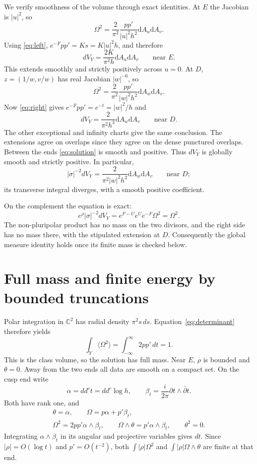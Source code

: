 \documentclass[11pt]{article}
\newcommand{\ddc}{dd^c}
\newcommand{\dA}{\mathrm dA}
\newcommand{\C}{\mathbb C}
\begin{document}
We verify smoothness of the volume through exact identities. At $E$
the Jacobian is $|u|^2$, so
\[
 \Omega^2=\frac2{\pi^2}\frac{pp'}{|u|^2h^2}\dA_u\dA_v.
\]
Using \eqref{eq:left}, $e^{-F}pp'=Ks=K|u|^2h$, and therefore
\begin{equation}\label{eq:volume-E}
 dV_Y=\frac{2K}{\pi^2h}\dA_u\dA_v
 \qquad\text{near }E.
\end{equation}
This extends smoothly and strictly positively across $u=0$.
At $D$, $z=(1/w,v/w)$ has real Jacobian $|w|^{-6}$, so
\[
 \Omega^2=\frac2{\pi^2}\frac{pp'}{|w|^2h^2}\dA_w\dA_v.
\]
Now \eqref{eq:right} gives $e^{-F}pp'=e^{-t}=|w|^2/h$ and
\begin{equation}\label{eq:volume-D}
 dV_Y=\frac2{\pi^2h^3}\dA_w\dA_v
 \qquad\text{near }D.
\end{equation}
The other exceptional and infinity charts give the same conclusion.
The extensions agree on overlaps since they agree on the dense punctured
overlaps. Between the ends \eqref{eq:solution} is smooth and positive.
Thus $dV_Y$ is globally smooth and strictly positive. In particular,
\[
 |\sigma|^{-2}dV_Y=\frac2{\pi^2|w|^2h^2}\dA_w\dA_v
 \qquad\text{near }D;
\]
its transverse integral diverges, with a smooth positive coefficient.

On the complement the equation is exact:
\[
 e^\rho|\sigma|^{-2}dV_Y
          =e^{F-U}e^Ue^{-F}\Omega^2=\Omega^2.
\]
The non-pluripolar product has no mass on the two divisors, and the
right side has no mass there, with the stipulated extension at $D$.
Consequently the global measure identity holds once its finite mass
is checked below.

\section{Full mass and finite energy by bounded truncations}
Polar integration in $\C^2$ has radial density $\pi^2s\,ds$.
Equation~\eqref{eq:determinant} therefore yields
\begin{equation}\label{eq:mass}
 \int_Y\langle\Omega^2\rangle
                 =\int_{-\infty}^{\infty}2pp'\,dt=1.
\end{equation}
This is the class volume, so the solution has full mass.
Near $E$, $\rho$ is bounded and $\theta=0$. Away from the two ends
all data are smooth on a compact set. On the cusp end write
\[
 \alpha=\ddc t=\ddc\log h,\qquad
 \beta_t=\frac i{2\pi}\partial t\wedge\bar\partial t.
\]
Both have rank one, and
\begin{gather*}
 \theta=\alpha,\qquad \Omega=p\alpha+p'\beta_t,\\
 \Omega^2=2pp'\alpha\wedge\beta_t,\qquad
 \Omega\wedge\theta=p'\alpha\wedge\beta_t,\qquad\theta^2=0.
\end{gather*}
Integrating $\alpha\wedge\beta_t$ in its angular and projective
variables gives $dt$. Since $|\rho|=O(\log t)$ and $p'=O(t^{-2})$,
both $\int|\rho|\Omega^2$ and $\int|\rho|\Omega\wedge\theta$
are finite at that end.
\end{document}
